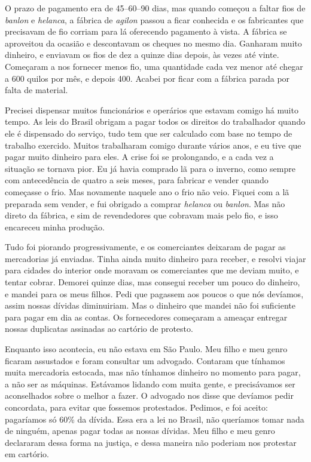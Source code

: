 O prazo de pagamento era de 45--60--90 dias, mas quando começou a
faltar fios de \textit{banlon} e \textit{helanca}, a fábrica de \textit{agilon} passou a ficar
conhecida e os fabricantes que precisavam de fio corriam para lá
oferecendo pagamento à vista. A fábrica se aproveitou da ocasião e descontavam os cheques no mesmo dia. Ganharam muito dinheiro, e enviavam os fios de dez a quinze dias depois, às vezes até vinte. Começaram a nos fornecer menos fio, uma quantidade cada vez menor até
chegar a 600 quilos por mês, e depois 400. Acabei por ficar com a
fábrica parada por falta de material.

Precisei dispensar muitos funcionários e operários que estavam 
comigo há muito tempo. As leis do Brasil obrigam a pagar todos os
direitos do trabalhador quando ele é dispensado do serviço, tudo tem que ser calculado com base no tempo de trabalho exercido.
Muitos trabalharam comigo durante vários anos, e eu tive que pagar muito
dinheiro para eles. A crise foi se prolongando, e a cada vez a situação se
tornava pior. Eu já havia comprado lã para o inverno, como
sempre com antecedência de quatro a seis meses, para fabricar e vender quando começasse o frio. Mas novamente naquele ano o frio não veio.
Fiquei com a lã preparada sem vender, e fui obrigado a comprar \textit{helanca} ou
\textit{banlon}. Mas não direto da fábrica, e sim de revendedores que cobravam mais
pelo fio, e isso encareceu minha produção.

Tudo foi piorando progressivamente, e os comerciantes deixaram de pagar as
mercadorias já enviadas. Tinha ainda muito dinheiro para
receber, e resolvi viajar para cidades do interior onde moravam os comerciantes que me
deviam muito, e tentar cobrar. Demorei quinze dias, mas consegui receber
um pouco do dinheiro, e mandei para os meus filhos. Pedi que pagassem aos poucos o que nós devíamos, assim nossas dívidas
diminuiriam. Mas o dinheiro que mandei não foi suficiente para pagar em dia
as contas. Os fornecedores começaram a ameaçar entregar
nossas duplicatas assinadas ao cartório de protesto.

Enquanto isso acontecia, eu não estava em São Paulo. Meu filho e meu
genro ficaram assustados e foram consultar um advogado. Contaram que tínhamos muita mercadoria estocada,
mas não tínhamos dinheiro no momento para pagar, a não ser as
máquinas. Estávamos lidando com muita gente, e precisávamos ser aconselhados 
sobre o melhor a fazer. O advogado nos disse que
devíamos pedir concordata, para evitar que fossemos protestados. Pedimos, e foi aceito: pagaríamos só 60\% da dívida. Essa era a lei no Brasil, não queríamos tomar
nada de ninguém, apenas pagar todas as nossas dívidas. Meu filho e
meu genro declararam dessa forma na justiça, e dessa maneira não poderiam nos
protestar em cartório.

